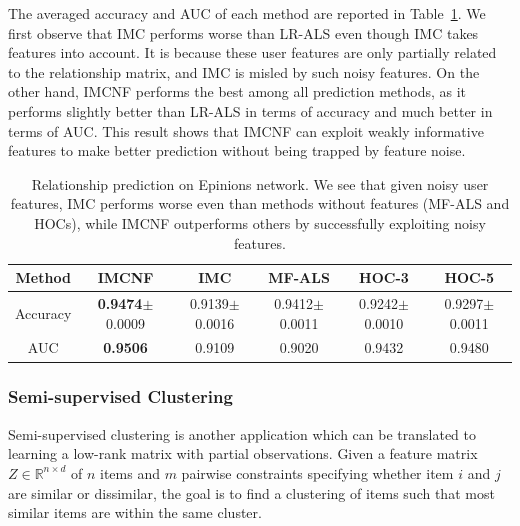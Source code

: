 \documentclass[twoside,11pt]{article}
\def\R{\mathbb{R}}
\begin{document}
The averaged accuracy and AUC of each method are reported in Table~\ref{tab:sign_prediction}.
We first observe that IMC performs worse than LR-ALS even though IMC takes features into account.
It is because these user features are only partially related to the relationship matrix,
and IMC is misled by such noisy features.
On the other hand, IMCNF performs the best among all
prediction methods, as it performs slightly better than
LR-ALS in terms of accuracy and much better in terms of AUC.
This result shows that IMCNF can exploit
weakly informative features to make better prediction without being trapped
by feature noise.

\begin{table}[t]
  \centering
  {\small
  \begin{tabular}{c||cc|ccc}
    Method &  IMCNF & IMC & MF-ALS & HOC-3 & HOC-5  \\ \hline
  Accuracy & {\bf 0.9474}$\pm$0.0009  & 0.9139$\pm$0.0016 & 0.9412$\pm$0.0011
           & 0.9242$\pm$0.0010 & 0.9297$\pm$0.0011 \\
       AUC & {\bf 0.9506} & 0.9109 & 0.9020 & 0.9432 & 0.9480
  \end{tabular}
}
  \caption{Relationship prediction on Epinions network.  We see that given noisy user
    features, IMC performs worse even than methods without features (MF-ALS and HOCs),
    while IMCNF outperforms others by successfully exploiting noisy features.}
  \label{tab:sign_prediction}
\end{table}

\subsubsection{Semi-supervised Clustering}
\label{subsec:exp.semi_clustering}
Semi-supervised clustering is another application which can be translated to
learning a low-rank matrix with partial observations.
Given a feature matrix $Z\in \R^{n\times d}$ of $n$ items
and $m$ pairwise constraints specifying
whether item $i$ and $j$ are similar or dissimilar, the goal is to find a clustering of items
such that most similar items are within the same cluster.
\end{document}
